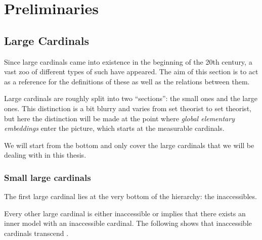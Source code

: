 \documentclass[../../main]{subfiles}
\begin{document}
\chapter{Preliminaries}
\thispagestyle{fancy}


\section{Large Cardinals}
\label{prelims.large-cardinals}

Since large cardinals came into existence in the beginning of the 20th century, a vast zoo of different types of such have appeared. The aim of this section is to act as a reference for the definitions of these as well as the relations between them.

\qquad Large cardinals are roughly split into two ``sections'': the small ones and the large ones. This distinction is a bit blurry and varies from set theorist to set theorist, but here the distinction will be made at the point where \textit{global elementary embeddings} enter the picture, which starts at the measurable cardinals.

\qquad We will start from the bottom and only cover the large cardinals that we will be dealing with in this thesis.

\subsection{Small large cardinals}

The first large cardinal lies at the very bottom of the hierarchy: the inaccessibles.


Every other large cardinal is either inaccessible or implies that there exists an inner model with an inaccessible cardinal. The following shows that inaccessible cardinals transcend \zfc.

\end{document}
